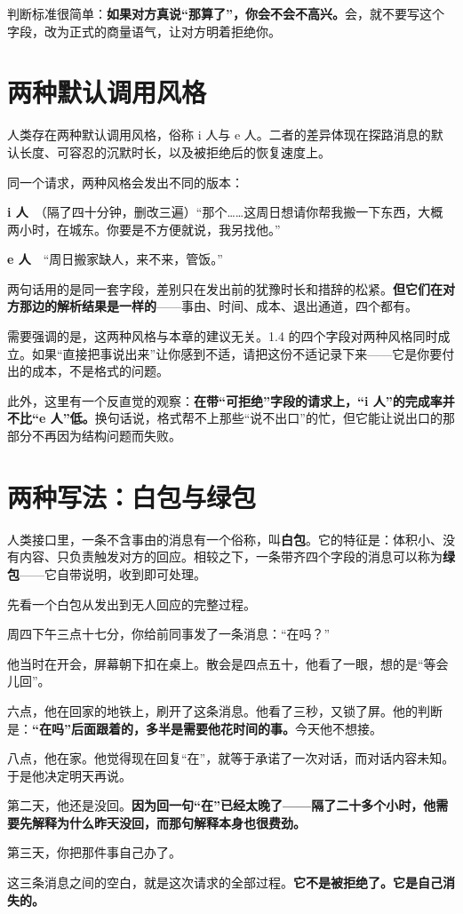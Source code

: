 判断标准很简单：\textbf{如果对方真说“那算了”，你会不会不高兴。}会，就不要写这个字段，改为正式的商量语气，让对方明着拒绝你。

\section{两种默认调用风格}

人类存在两种默认调用风格，俗称 i 人与 e 人。二者的差异体现在探路消息的默认长度、可容忍的沉默时长，以及被拒绝后的恢复速度上。

同一个请求，两种风格会发出不同的版本：

\begin{mdquote}
\textbf{i 人}　（隔了四十分钟，删改三遍）“那个……这周日想请你帮我搬一下东西，大概两小时，在城东。你要是不方便就说，我另找他。”

\textbf{e 人}　“周日搬家缺人，来不来，管饭。”
\end{mdquote}

两句话用的是同一套字段，差别只在发出前的犹豫时长和措辞的松紧。\textbf{但它们在对方那边的解析结果是一样的}——事由、时间、成本、退出通道，四个都有。

需要强调的是，这两种风格与本章的建议无关。1.4 的四个字段对两种风格同时成立。如果“直接把事说出来”让你感到不适，请把这份不适记录下来——它是你要付出的成本，不是格式的问题。

此外，这里有一个反直觉的观察：\textbf{在带“可拒绝”字段的请求上，“i 人”的完成率并不比“e 人”低。}换句话说，格式帮不上那些“说不出口”的忙，但它能让说出口的那部分不再因为结构问题而失败。

\section{两种写法：白包与绿包}

人类接口里，一条不含事由的消息有一个俗称，叫\textbf{白包}。它的特征是：体积小、没有内容、只负责触发对方的回应。相较之下，一条带齐四个字段的消息可以称为\textbf{绿包}——它自带说明，收到即可处理。

先看一个白包从发出到无人回应的完整过程。

\begin{mdquote}


周四下午三点十七分，你给前同事发了一条消息：“在吗？”

他当时在开会，屏幕朝下扣在桌上。散会是四点五十，他看了一眼，想的是“等会儿回”。

六点，他在回家的地铁上，刷开了这条消息。他看了三秒，又锁了屏。他的判断是：\textbf{“在吗”后面跟着的，多半是需要他花时间的事。}今天他不想接。

八点，他在家。他觉得现在回复“在”，就等于承诺了一次对话，而对话内容未知。于是他决定明天再说。

第二天，他还是没回。\textbf{因为回一句“在”已经太晚了——隔了二十多个小时，他需要先解释为什么昨天没回，而那句解释本身也很费劲。}

第三天，你把那件事自己办了。

这三条消息之间的空白，就是这次请求的全部过程。\textbf{它不是被拒绝了。它是自己消失的。}
\end{mdquote}

